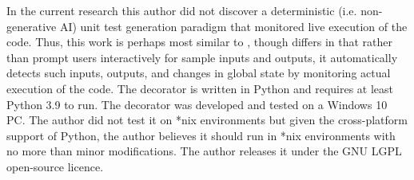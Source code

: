 In the current research this author did not discover a deterministic (i.e.
non-generative AI) unit test generation paradigm that monitored live execution
of the code.
%
Thus, this work is perhaps most similar to 
\cite{lahiri2023interactivecodegenerationtestdriven}, though
differs in that rather than prompt users interactively for sample inputs and
outputs, it automatically detects such inputs, outputs, and changes in global
state by monitoring actual execution of the code.
%
The decorator is written in Python and requires at least Python 3.9 to run.
%
The decorator was developed and tested on a Windows 10 PC.  The author 
did not test it on *nix environments but given the cross-platform support of
Python, the author believes it should run in *nix environments with no more than
minor modifications.
%
The author releases it under the GNU LGPL open-source licence.
